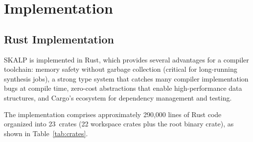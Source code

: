 \documentclass[conference]{IEEEtran}
\begin{document}
\section{Implementation}
\label{sec:implementation}

\subsection{Rust Implementation}

SKALP is implemented in Rust, which provides several advantages for a compiler toolchain: memory safety without garbage collection (critical for long-running synthesis jobs), a strong type system that catches many compiler implementation bugs at compile time, zero-cost abstractions that enable high-performance data structures, and Cargo's ecosystem for dependency management and testing.

The implementation comprises approximately 290,000 lines of Rust code organized into 23~crates (22 workspace crates plus the root binary crate), as shown in Table~\ref{tab:crates}.
\end{document}
